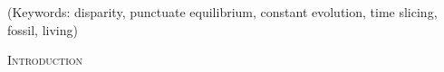 \documentclass[12pt,letterpaper]{article}
\renewcommand{\section}[1]{%
\bigskip
\begin{center}
\begin{Large}
\normalfont\scshape #1
\medskip
\end{Large}
\end{center}}
\begin{document}
\noindent (Keywords: disparity, punctuate equilibrium, constant evolution, time slicing, fossil, living)\\

\vspace{1.5in}

\newpage 

%
%

\section{Introduction}


\end{document}
